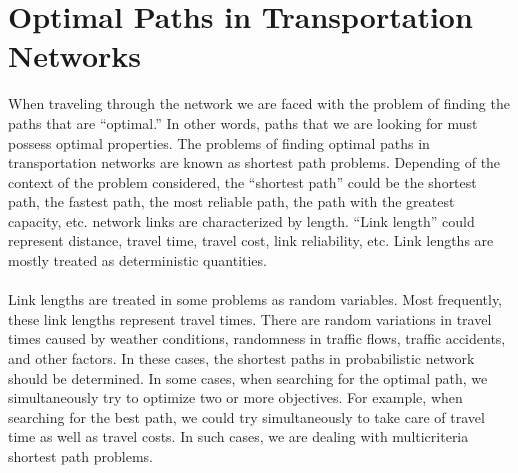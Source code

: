 \section{Optimal Paths in Transportation Networks}
When traveling through the network we are faced with the problem of finding the paths that are “optimal.” In other words, paths that we are looking for must possess optimal properties. The problems of finding optimal paths in transportation networks are known as shortest path problems. Depending of the context of the problem considered, the “shortest path” could be the shortest path, the fastest path, the most reliable path, the path with the greatest capacity, etc. network links are characterized by length. “Link length” could represent distance, travel time, travel cost, link reliability, etc. Link lengths are mostly treated as deterministic quantities.\\\\
Link lengths are treated in some problems as random variables. Most frequently, these link lengths represent travel times. There are random variations in travel times caused by weather conditions, randomness in traffic flows, traffic accidents, and other factors. In these cases, the shortest paths in probabilistic network should be determined. In some cases, when searching for the optimal path, we simultaneously try to optimize two or more objectives. For example, when searching for the best path, we could try simultaneously to take care of travel time as well as travel costs. In such cases, we are dealing with multicriteria shortest path problems.
%
